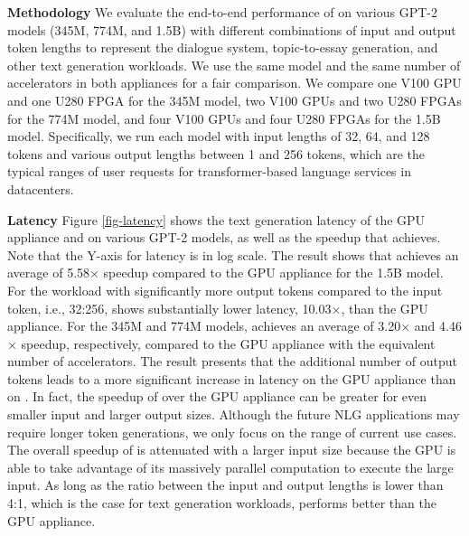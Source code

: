 \textbf{Methodology}
We evaluate the end-to-end performance of \sysname{} on various GPT-2 models (345M, 774M, and 1.5B) with different combinations of input and output token lengths to represent the dialogue system, topic-to-essay generation, and other text generation workloads. We use the same model and the same number of accelerators in both appliances for a fair comparison.
We compare one V100 GPU and one U280 FPGA for the 345M model, two V100 GPUs and two U280 FPGAs for the  774M model, and four V100 GPUs and four U280 FPGAs for the 1.5B model. Specifically, we run each model with input lengths of 32, 64, and 128 tokens and various output lengths between 1 and 256 tokens, which are the typical ranges of user requests for transformer-based language services in datacenters\cite{tokenratio}. 



\textbf{Latency} 
Figure \ref{fig-latency} shows the text generation latency of the GPU appliance and \sysname{} on various GPT-2 models, as well as the speedup that \sysname{} achieves. Note that the Y-axis for latency is in log scale. The result shows that \sysname{} achieves an average of 5.58$\times$ speedup compared to the GPU appliance for the 1.5B model. For the workload with significantly more output tokens compared to the input token, i.e., 32:256, \sysname{} shows substantially lower latency, 10.03$\times$, than the GPU appliance. For the 345M and 774M models, \sysname{} achieves an average of 3.20$\times$ and 4.46$\times$ speedup, respectively, compared to the GPU appliance with the equivalent number of accelerators. The result presents that the additional number of output tokens leads to a more significant increase in latency on the GPU appliance than on \sysname{}. In fact, the speedup of \sysname{} over the GPU appliance can be greater for even smaller input and larger output sizes. Although the future NLG applications may require longer token generations, we only focus on the range of current use cases. 
The overall speedup of \sysname{} is attenuated with a larger input size because the GPU is able to take advantage of its massively parallel computation to execute the large input. As long as the ratio between the input and output lengths is lower than 4:1, which is the case for text generation workloads, \sysname{} performs better than the GPU appliance. 

